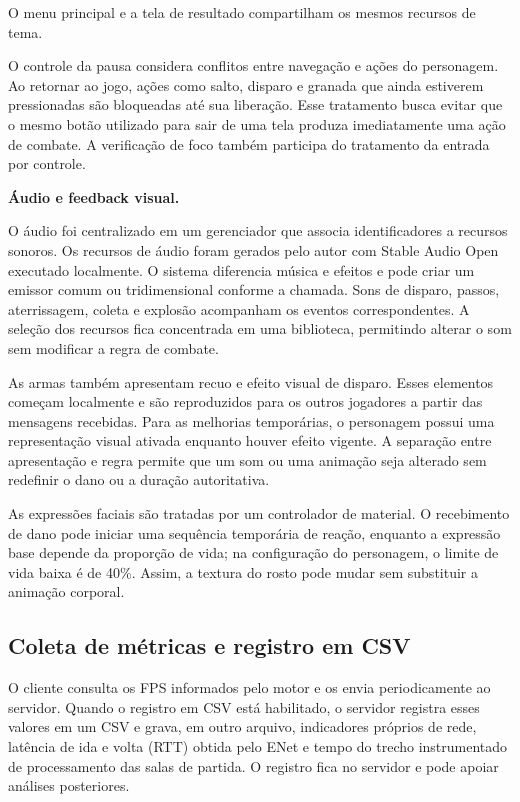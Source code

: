 O menu principal e a tela de resultado compartilham os mesmos recursos de tema.

O controle da pausa considera conflitos entre navegação e ações do personagem. Ao retornar ao jogo, ações como salto, disparo e granada que ainda estiverem pressionadas são bloqueadas até sua liberação. Esse tratamento busca evitar que o mesmo botão utilizado para sair de uma tela produza imediatamente uma ação de combate. A verificação de foco também participa do tratamento da entrada por controle.

\textbf{Áudio e feedback visual.}

O áudio foi centralizado em um gerenciador que associa identificadores a recursos sonoros. Os recursos de áudio foram gerados pelo autor com Stable Audio Open executado localmente. O sistema diferencia música e efeitos e pode criar um emissor comum ou tridimensional conforme a chamada. Sons de disparo, passos, aterrissagem, coleta e explosão acompanham os eventos correspondentes. A seleção dos recursos fica concentrada em uma biblioteca, permitindo alterar o som sem modificar a regra de combate.

As armas também apresentam recuo e efeito visual de disparo. Esses elementos começam localmente e são reproduzidos para os outros jogadores a partir das mensagens recebidas. Para as melhorias temporárias, o personagem possui uma representação visual ativada enquanto houver efeito vigente. A separação entre apresentação e regra permite que um som ou uma animação seja alterado sem redefinir o dano ou a duração autoritativa.

As expressões faciais são tratadas por um controlador de material. O recebimento de dano pode iniciar uma sequência temporária de reação, enquanto a expressão base depende da proporção de vida; na configuração do personagem, o limite de vida baixa é de 40\%. Assim, a textura do rosto pode mudar sem substituir a animação corporal.

\subsection{Coleta de métricas e registro em CSV}\label{sec:5.2.10}

O cliente consulta os FPS informados pelo motor e os envia periodicamente ao servidor. Quando o registro em CSV está habilitado, o servidor registra esses valores em um CSV e grava, em outro arquivo, indicadores próprios de rede, latência de ida e volta (RTT) obtida pelo ENet e tempo do trecho instrumentado de processamento das salas de partida. O registro fica no servidor e pode apoiar análises posteriores.

